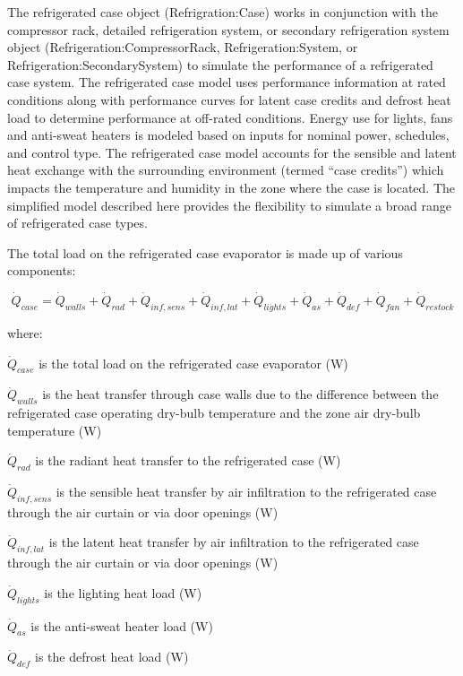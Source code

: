 The refrigerated case object (Refrigration:Case) works in conjunction with the compressor rack, detailed refrigeration system, or secondary refrigeration system object (Refrigeration:CompressorRack, Refrigeration:System, or Refrigeration:SecondarySystem) to simulate the performance of a refrigerated case system. The refrigerated case model uses performance information at rated conditions along with performance curves for latent case credits and defrost heat load to determine performance at off-rated conditions. Energy use for lights, fans and anti-sweat heaters is modeled based on inputs for nominal power, schedules, and control type. The refrigerated case model accounts for the sensible and latent heat exchange with the surrounding environment (termed ``case credits'') which impacts the temperature and humidity in the zone where the case is located. The simplified model described here provides the flexibility to simulate a broad range of refrigerated case types.

The total load on the refrigerated case evaporator is made up of various components:

\begin{equation}
{\dot Q_{case}} = {\dot Q_{walls}} + {\dot Q_{rad}} + {\dot Q_{inf,sens}} + {\dot Q_{inf,lat}} + {\dot Q_{lights}} + {\dot Q_{as}} + {\dot Q_{def}} + {\dot Q_{fan}} + {\dot Q_{restock}}
\label{eq:TotalLoadRefCaseEvaporator}
\end{equation}

where:

\({\dot Q_{case}}\) is the total load on the refrigerated case evaporator (W)

\({\dot Q_{walls}}\) is the heat transfer through case walls due to the difference between the refrigerated case operating dry-bulb temperature and the zone air dry-bulb temperature (W)

\({\dot Q_{rad}}\) is the radiant heat transfer to the refrigerated case (W)

\({\dot Q_{inf,sens}}\) is the sensible heat transfer by air infiltration to the refrigerated case through the air curtain or via door openings (W)

\({\dot Q_{inf,lat}}\) is the latent heat transfer by air infiltration to the refrigerated case through the air curtain or via door openings (W)

\({\dot Q_{lights}}\) is the lighting heat load (W)

\({\dot Q_{as}}\) is the anti-sweat heater load (W)

\({\dot Q_{def}}\) is the defrost heat load (W)

